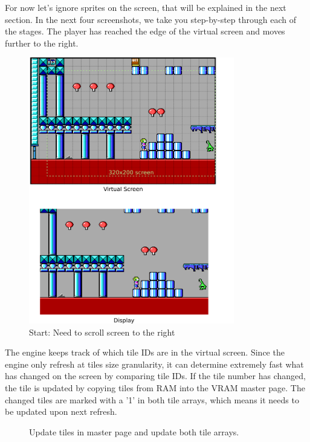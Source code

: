 \documentclass[book.tex]{subfiles}
\begin{document}
For now let's ignore sprites on the screen, that will be explained in the next section. In the next four screenshots, we take you step-by-step through each of the stages. The player has reached the edge of the virtual screen and moves further to the right. \\

\begin{figure}[H]
\centering
 \includegraphics[width=0.8\textwidth]{screenshots_300dpi/game/Keen_ATR_1-3_a.png}
 \caption{Start: Need to scroll screen to the right}
 \label{fig:kc1_3_start}
\end{figure}

\pagebreak
The engine keeps track of which tile IDs are in the virtual screen. Since the engine only refresh at tiles size granularity, it can determine extremely fast what has changed on the screen by comparing tile IDs. If the tile number has changed, the tile is updated by copying tiles from RAM into the VRAM master page. The changed tiles are marked with a '1' in both tile arrays, which means it needs to be updated upon next refresh.

\begin{figure}[H]
\centering
 \caption{Update tiles in master page and update both tile arrays.}
 \label{fig:kc1_3_step1}
\end{figure}
\end{document}
